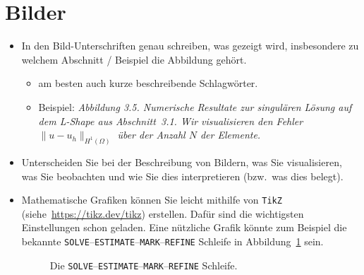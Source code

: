 \documentclass[../main.tex]{subfiles}
\begin{document}
\section{Bilder}

\begin{itemize}
  \item In den Bild-Unterschriften genau schreiben, was gezeigt wird, insbesondere zu welchem Abschnitt / Beispiel die Abbildung gehört.
        \begin{itemize}
          \item am besten auch kurze beschreibende Schlagwörter.
          \item Beispiel: \emph{Abbildung 3.5. Numerische Resultate zur singulären Lösung auf dem L-Shape aus  Abschnitt~3.1. Wir visualisieren den Fehler $\|u-u_h\|_{H^1(\Omega)}$ über der Anzahl $N$ der Elemente.}
        \end{itemize}

  \item Unterscheiden Sie bei der Beschreibung von Bildern, was Sie visualisieren, was Sie beobachten und wie Sie dies interpretieren (bzw.\ was dies belegt).

  \item Mathematische Grafiken können Sie leicht mithilfe von \verb$TikZ$ (siehe~\url{https://tikz.dev/tikz}) erstellen. Dafür sind die wichtigsten Einstellungen schon geladen. Eine nützliche Grafik könnte zum Beispiel die bekannte \texttt{SOLVE}--\texttt{ESTIMATE}--\texttt{MARK}--\texttt{REFINE} Schleife in Abbildung~\ref{fig:afem} sein.
        \begin{figure}
          \centering
          \caption{Die \texttt{SOLVE}--\texttt{ESTIMATE}--\texttt{MARK}--\texttt{REFINE} Schleife.\label{fig:afem}}
        \end{figure}


\end{itemize}
\end{document}
